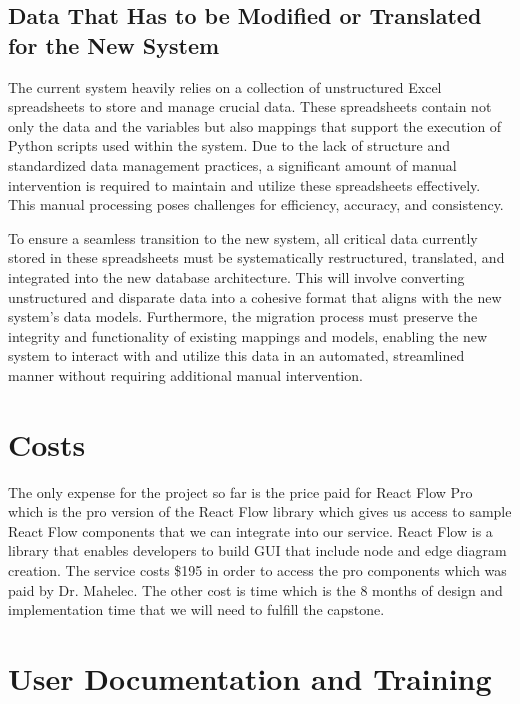 \documentclass[12pt]{article}
\begin{document}
\subsection{Data That Has to be Modified or Translated for the New System}

The current system heavily relies on a collection of unstructured Excel spreadsheets to store and manage crucial data. These spreadsheets contain not only the data and the variables but also mappings that support the execution of Python scripts used within the system. Due to the lack of structure and standardized data management practices, a significant amount of manual intervention is required to maintain and utilize these spreadsheets effectively. This manual processing poses challenges for efficiency, accuracy, and consistency.

To ensure a seamless transition to the new system, all critical data currently stored in these spreadsheets must be systematically restructured, translated, and integrated into the new database architecture. This will involve converting unstructured and disparate data into a cohesive format that aligns with the new system’s data models. Furthermore, the migration process must preserve the integrity and functionality of existing mappings and models, enabling the new system to interact with and utilize this data in an automated, streamlined manner without requiring additional manual intervention.
\section{Costs}
The only expense for the project so far is the price paid for React Flow Pro which is the pro version of the React Flow library which gives us access to sample React Flow components that we can integrate into our service. React Flow is a library that enables developers to build GUI that include node and edge diagram creation. The service costs \$195 in order to access the pro components which was paid by Dr. Mahelec. The other cost is time which is the 8 months of design and implementation time that we will need to fulfill the capstone. 
\section{User Documentation and Training}
\end{document}
